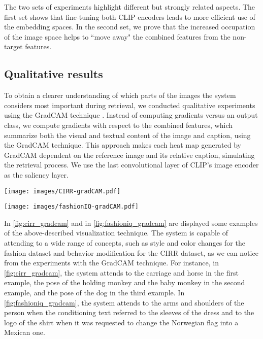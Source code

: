 \documentclass[acmlarge]{acmart}
\begin{document}
The two sets of experiments highlight different but strongly related aspects. The first set shows that fine-tuning both CLIP encoders leads to more efficient use of the embedding spaces. In the second set, we prove that the increased occupation of the image space helps to ``move away" the combined features from the non-target features.



\subsection{Qualitative results}
To obtain a clearer understanding of which parts of the images the system considers most important during retrieval, we conducted qualitative experiments using the GradCAM technique \cite{Selvaraju2019gradCAM}.
Instead of computing gradients versus an output class, we compute gradients with respect to the combined features, which summarize both the visual and textual content of the image and caption, using the GradCAM technique. This approach makes each heat map generated by GradCAM dependent on the reference image and its relative caption, simulating the retrieval process. We use the last convolutional layer of CLIP's image encoder as the saliency layer.

\begin{figure*}[t]
    \centering
    \texttt{[image: images/CIRR-gradCAM.pdf]}
    \vspace{-1ex}

    \caption{Examples of GradCAM visualization on CIRR dataset computing the gradients with respect to the Combiner output.}
    \label{fig:cirr_gradcam}
    \vspace{-2ex}
\end{figure*}

\begin{figure*}[t]
    \centering
    \texttt{[image: images/fashionIQ-gradCAM.pdf]}
        \vspace{-1ex}
    \caption{Examples of GradCAM visualization on FashionIQ computing the gradients with respect to the Combiner output.}
    \label{fig:fashioniq_gradcam}
    \vspace{-3ex}

\end{figure*}

In \cref{fig:cirr_gradcam} and in \cref{fig:fashioniq_gradcam} are displayed some examples of the above-described visualization technique.
The system is capable of attending to a wide range of concepts, such as style and color changes for the fashion dataset and behavior modification for the CIRR dataset, as we can notice from the experiments with the GradCAM technique. For instance, in \cref{fig:cirr_gradcam}, the system attends to the carriage and horse in the first example, the pose of the holding monkey and the baby monkey in the second example, and the pose of the dog in the third example. In \cref{fig:fashioniq_gradcam}, the system attends to the arms and shoulders of the person when the conditioning text referred to the sleeves of the dress and to the logo of the shirt when it was requested to change the Norwegian flag into a Mexican one. 
\end{document}

